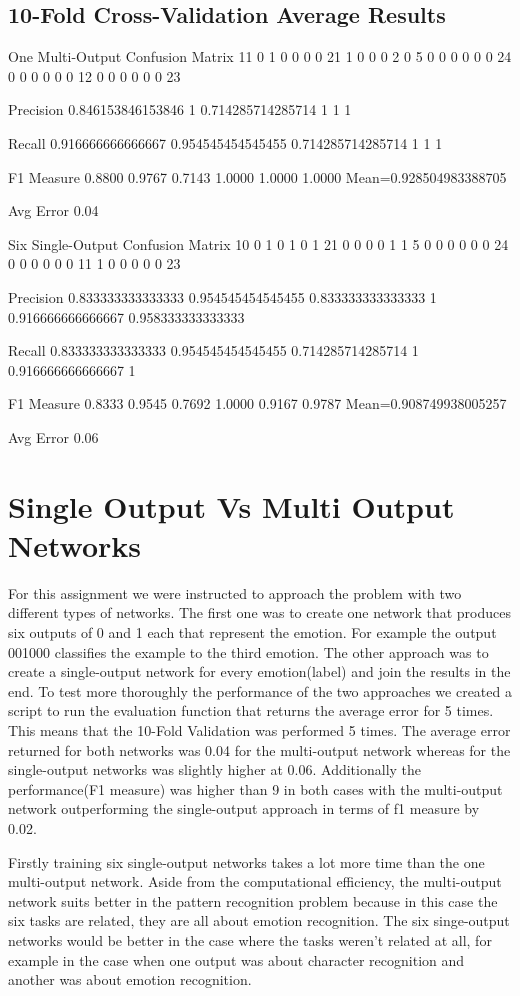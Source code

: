 \documentclass[a4paper,11pt]{article}
\begin{document}
\subsection{10-Fold Cross-Validation Average Results}

One Multi-Output Confusion Matrix
11	0	1	0	0	0
0	21	1	0	0	0
2	0	5	0	0	0
0	0	0	24	0	0
0	0	0	0	12	0
0	0	0	0	0	23

Precision
0.846153846153846	1	0.714285714285714	1	1	1

Recall
0.916666666666667	0.954545454545455	0.714285714285714	1	1	1

F1 Measure
0.8800    0.9767    0.7143    1.0000    1.0000    1.0000 Mean=0.928504983388705


Avg Error
0.04


Six Single-Output Confusion Matrix
10	0	1	0	1	0
1	21	0	0	0	0
1	1	5	0	0	0
0	0	0	24	0	0
0	0	0	0	11	1
0	0	0	0	0	23

Precision
0.833333333333333	0.954545454545455	0.833333333333333	1	0.916666666666667	0.958333333333333

Recall
0.833333333333333	0.954545454545455	0.714285714285714	1	0.916666666666667	1

F1 Measure
0.8333    0.9545    0.7692    1.0000    0.9167    0.9787 Mean=0.908749938005257

Avg Error
0.06

\section{Single Output Vs Multi Output Networks}
For this assignment we were instructed to approach the problem with two different types of networks. The first one was to create one network that produces six outputs of 0 and 1 each that represent the emotion. For example the output 001000 classifies the example to the third emotion. The other approach was to create a single-output network for every emotion(label) and join the results in the end.
To test more thoroughly the performance of the two approaches we created a script to run the evaluation function that returns the average error for 5 times. This means that the 10-Fold Validation was performed 5 times. The average error returned for both networks was 0.04 for the multi-output network whereas for the single-output networks was slightly higher at 0.06. Additionally the performance(F1 measure) was higher than 9 in both cases with the multi-output network outperforming the single-output approach in terms of f1 measure by 0.02.

Firstly training six single-output networks takes a lot more time than the one multi-output network. Aside from the computational efficiency, the multi-output network suits better in the pattern recognition problem because in this case the six tasks are related, they are all about emotion recognition. The six singe-output networks would be better in the case where the tasks weren’t related at all, for example in the case when one output was about character recognition and another was about emotion recognition.
\end{document}
